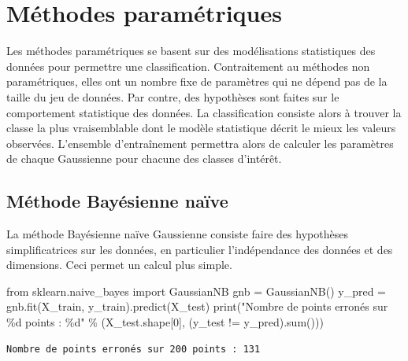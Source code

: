 \documentclass[
  11pt,
  letterpaper,
  open=any,
  twoside=false,
  french]{scrbook}
\newenvironment{Shaded}{\begin{snugshade}}{\end{snugshade}}
\newcommand{\BuiltInTok}[1]{\textcolor[rgb]{0.00,0.23,0.31}{#1}}
\newcommand{\DecValTok}[1]{\textcolor[rgb]{0.68,0.00,0.00}{#1}}
\newcommand{\ImportTok}[1]{\textcolor[rgb]{0.00,0.46,0.62}{#1}}
\newcommand{\NormalTok}[1]{\textcolor[rgb]{0.00,0.23,0.31}{#1}}
\newcommand{\OperatorTok}[1]{\textcolor[rgb]{0.37,0.37,0.37}{#1}}
\newcommand{\SpecialCharTok}[1]{\textcolor[rgb]{0.37,0.37,0.37}{#1}}
\newcommand{\StringTok}[1]{\textcolor[rgb]{0.13,0.47,0.30}{#1}}
\begin{document}
\section{Méthodes paramétriques}\label{muxe9thodes-paramuxe9triques}

Les méthodes paramétriques se basent sur des modélisations statistiques
des données pour permettre une classification. Contraitement au méthodes
non paramétriques, elles ont un nombre fixe de paramètres qui ne dépend
pas de la taille du jeu de données. Par contre, des hypothèses sont
faites sur le comportement statistique des données. La classification
consiste alors à trouver la classe la plus vraisemblable dont le modèle
statistique décrit le mieux les valeurs observées. L'ensemble
d'entraînement permettra alors de calculer les paramètres de chaque
Gaussienne pour chacune des classes d'intérêt.

\subsection{Méthode Bayésienne
naïve}\label{muxe9thode-bayuxe9sienne-nauxefve}

La méthode Bayésienne naïve Gaussienne consiste faire des hypothèses
simplificatrices sur les données, en particulier l'indépendance des
données et des dimensions. Ceci permet un calcul plus simple.

\begin{Shaded}
\begin{Highlighting}[]
\ImportTok{from}\NormalTok{ sklearn.naive\_bayes }\ImportTok{import}\NormalTok{ GaussianNB}
\NormalTok{gnb }\OperatorTok{=}\NormalTok{ GaussianNB()}
\NormalTok{y\_pred }\OperatorTok{=}\NormalTok{ gnb.fit(X\_train, y\_train).predict(X\_test)}
\BuiltInTok{print}\NormalTok{(}\StringTok{"Nombre de points erronés sur }\SpecialCharTok{\%d}\StringTok{ points : }\SpecialCharTok{\%d}\StringTok{"}
      \OperatorTok{\%}\NormalTok{ (X\_test.shape[}\DecValTok{0}\NormalTok{], (y\_test }\OperatorTok{!=}\NormalTok{ y\_pred).}\BuiltInTok{sum}\NormalTok{()))}
\end{Highlighting}
\end{Shaded}

\begin{verbatim}
Nombre de points erronés sur 200 points : 131
\end{verbatim}
\end{document}
